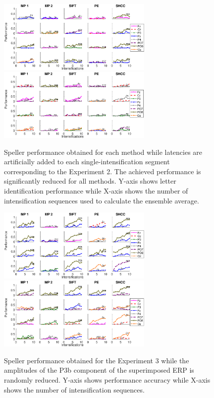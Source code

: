 \documentclass[brainsci,article,submit,moreauthors,pdftex,10pt,a4paper]{mdpi}
\begin{document}
\begin{figure}[H]
\centering
\includegraphics[width=7.5cm]{images/1-2.eps}
\includegraphics[width=7.5cm]{images/2-2.eps}
\caption{Speller performance obtained for each method while latencies are artificially added to each single-intensification segment corresponding to the Experiment 2.  The achieved performance is significantly reduced for all methods. Y-axis shows letter identification performance while X-axis shows the number of intensification sequences used to calculate the ensemble average.}
\label{fig:performancetestlatency}
\end{figure}


\begin{figure}[H]
\centering
\includegraphics[width=7.5cm]{images/1-3.eps}
\includegraphics[width=7.5cm]{images/2-3.eps}
\caption{Speller performance obtained for the Experiment 3 while the amplitudes of the P3b component of the superimposed ERP is randomly reduced. Y-axis shows performance accuracy while X-axis shows the number of intensification sequences.}
\label{fig:performancetestamplitude}
\end{figure}
\end{document}
